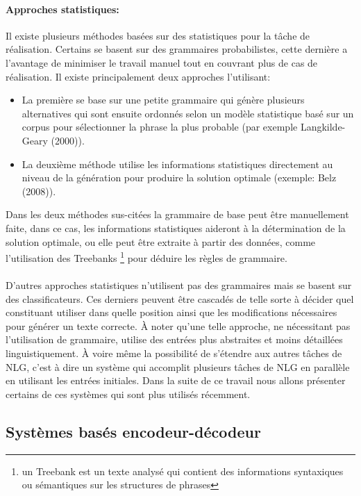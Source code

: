 \paragraph{Approches statistiques:} Il existe plusieurs méthodes basées sur des statistiques pour la tâche de réalisation. Certains se basent sur des grammaires probabilistes, cette dernière a l’avantage de minimiser le travail manuel tout en couvrant plus de cas de réalisation. Il existe principalement deux approches l’utilisant\cite{Gatt2018}:
\begin{itemize}
	\item La première se base sur une petite grammaire qui génère plusieurs alternatives qui sont ensuite ordonnés selon un modèle statistique basé sur un corpus pour sélectionner la phrase la plus probable (par exemple Langkilde-Geary (2000)\cite{LangkildeGeary2000}).
	\item La deuxième méthode utilise les informations statistiques directement au niveau de la génération pour produire la solution optimale (exemple: Belz (2008)\cite{Belz2008}).
\end{itemize}
	Dans les deux méthodes sus-citées la grammaire de base peut être manuellement faite, dans ce cas, les informations statistiques aideront à la détermination de la solution optimale, ou elle peut être extraite à partir des données, comme l’utilisation des Treebanks \footnote{un Treebank est un texte analysé qui contient des informations syntaxiques ou sémantiques sur les structures de phrases} pour déduire les règles de grammaire\cite{Espinosa2008}.\newline
\paragraph{}
D’autres approches statistiques n’utilisent pas des grammaires mais se basent sur des classificateurs. Ces derniers peuvent être cascadés de telle sorte à décider quel constituant utiliser dans quelle position ainsi que les modifications nécessaires pour générer un texte correcte. À noter qu’une telle approche, ne nécessitant pas l’utilisation de grammaire, utilise des entrées plus abstraites et moins détaillées linguistiquement. À voire même la possibilité de s’étendre aux autres tâches de NLG, c’est à dire un système qui accomplit plusieurs tâches de NLG en parallèle en utilisant les entrées initiales. Dans la suite de ce travail nous allons présenter certains de ces systèmes qui sont plus utilisés récemment.

\subsection{Systèmes basés encodeur-décodeur}
